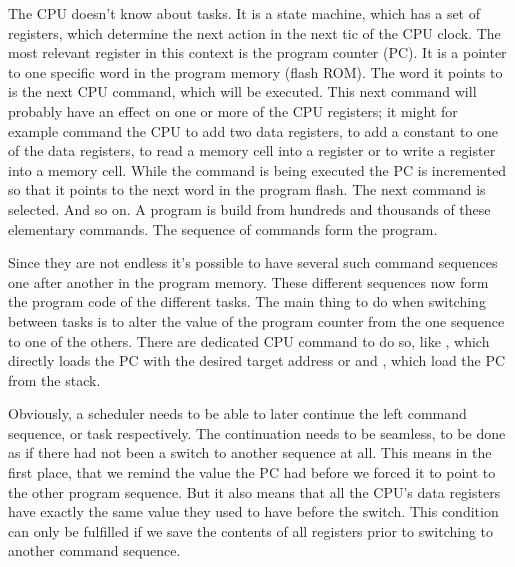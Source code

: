 The CPU doesn't know about tasks. It is a state machine, which has a set
of registers, which determine the next action in the next tic of the CPU
clock. The most relevant register in this context is the program counter
(PC). It is a pointer to one specific word in the program memory (flash
ROM). The word it points to is the next CPU command, which will be
executed. This next command will probably have an effect on one or more of
the CPU registers; it might for example command the CPU to add two data
registers, to add a constant to one of the data registers, to read a
memory cell into a register or to write a register into a memory cell.
While the command is being executed the PC is incremented so that it
points to the next word in the program flash. The next command is
selected. And so on. A program is build from hundreds and thousands of
these elementary commands. The sequence of commands form the program.

Since they are not endless it's possible to have several such command
sequences one after another in the program memory. These different
sequences now form the program code of the different tasks. The main thing
to do when switching between tasks is to alter the value of the program
counter from the one sequence to one of the others. There are dedicated
CPU command to do so, like , which directly loads the PC with
the desired target address or  and , which load the
PC from the stack.

Obviously, a scheduler needs to be able to later continue the left command
sequence, or task respectively. The continuation needs to be seamless, to
be done as if there had not been a switch to another sequence at all. This
means in the first place, that we remind the value the PC had before we
forced it to point to the other program sequence. But it also means that
all the CPU's data registers have exactly the same value they used to have
before the switch. This condition can only be fulfilled if we save the
contents of all registers prior to switching to another command sequence.

